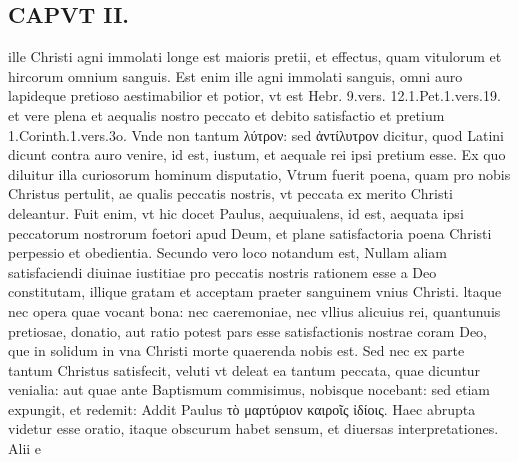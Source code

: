 \documentclass{article}
\begin{document}
\begin{pages}
\section*{CAPVT  II. }
\marginpar{[ p.61 ]}\pstart ille Christi agni immolati longe est maioris pretii, et effectus, quam vitulorum et hircorum omnium sanguis. Est enim ille agni immolati sanguis, omni auro lapideque pretioso aestimabilior et potior, vt est Hebr. 9.vers. 12.1.Pet.1.vers.19. et vere plena et aequalis nostro peccato et debito satisfactio et pretium 1.Corinth.1.vers.3o. Vnde non tantum λύτρον: sed ἀντίλυτρον dicitur, quod Latini dicunt contra auro venire, id est, iustum, et aequale rei ipsi pretium esse. Ex quo diluitur illa curiosorum hominum disputatio, Vtrum fuerit poena, quam pro nobis Christus pertulit, ae qualis peccatis nostris, vt peccata ex merito Christi deleantur. Fuit enim, vt hic docet Paulus, aequiualens, id est, aequata ipsi peccatorum nostrorum foetori apud Deum, et plane satisfactoria poena Christi perpessio et obedientia. Secundo vero loco notandum est, Nullam aliam satisfaciendi diuinae iustitiae pro peccatis nostris rationem esse a Deo constitutam, illique gratam et acceptam praeter sanguinem vnius Christi. ltaque nec opera quae vocant bona: nec caeremoniae, nec vllius alicuius rei, quantunuis pretiosae, donatio, aut ratio potest pars esse satisfactionis nostrae coram Deo, que in solidum in vna Christi morte quaerenda nobis est. Sed nec ex parte tantum Christus satisfecit, veluti vt deleat ea tantum peccata, quae dicuntur venialia: aut quae ante Baptismum commisimus, nobisque nocebant: sed etiam expungit, et redemit: Addit Paulus τὸ μαρτύριον καιροῖς ἰδίοις. Haec abrupta videtur esse oratio, itaque obscurum habet sensum, et diuersas interpretationes. Alii e\pend

\end{pages}
\end{document}
